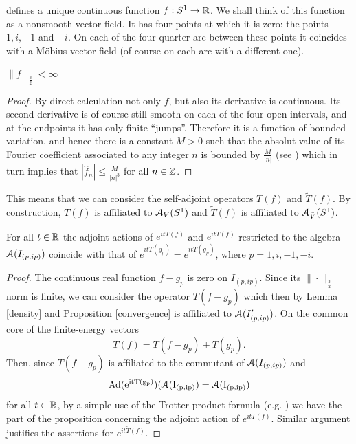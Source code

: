 \documentclass[12pt]{article}
\begin{document}
defines a unique continuous function $f: S^1 \rightarrow {\mathbb R}$.
We shall think of this function as a nonsmooth vector field. 
It has four points at which it is zero: the points $1,i,-1$
and $-i$. On each of the four quarter-arc between these points it 
coincides with a M\"obius vector field (of course on each arc
with a different one). 
\begin{lemma}
$\|f\|_{\frac{3}{2}} < \infty$
\end{lemma}
\begin{proof}
By direct calculation not only $f$, but also its derivative is
continuous. Its second derivative is of course still smooth on
each of the four open intervals, and at the endpoints it has only 
finite ``jumps''. Therefore it is a function of bounded variation, 
and hence there is a constant $M>0$ such that the absolut value of its 
Fourier coefficient associated
to any integer $n$ is bounded by
$\frac{M}{|n|}$ (see \cite[Sect. I.4]{katznelson})
which in turn implies that
$|\hat{f}_n| \leq \frac{M}{|n|^3}$ for all $n \in {\mathbb Z}$. 
\end{proof}
This means that we can consider the self-adjoint operators 
$T(f)$ and $\tilde{T}(f)$. By construction, $T(f)$ is affiliated to 
${\mathcal A}_V(S^1)$ and $\tilde{T}(f)$ is affiliated to ${\mathcal A}_{\tilde{V}}(S^1)$.
\begin{proposition}
For all $t \in {\mathbb R}$ the adjoint actions of $e^{itT(f)}$ and 
$e^{it\tilde{T}(f)}$ restricted to the algebra ${\mathcal A}(I_{(p,ip)})$
coincide with that of $e^{itT(g_p)}=e^{it\tilde{T}(g_p)}$,
where $p=1,i,-1,-i$. 
\end{proposition}
\begin{proof}
The continuous real function $f-g_p$ is zero on $I_{(p,ip)}$.
Since its $\|\cdot\|_{\frac{3}{2}}$ norm is finite, we can consider
the operator $T(f-g_p)$ which then by Lemma \ref{density} and Proposition
\ref{convergence} is affiliated to ${\mathcal A}(I_{(p,ip)}')$. On the common
core of the finite-energy vectors 
\begin{equation}
T(f)=T(f-g_p)+T(g_p).
\end{equation}
Then, since $T(f-g_p)$ is affiliated to the commutant of ${\mathcal A}(I_{(p,ip)})$ 
and
\begin{equation}
\rm{Ad}(e^{itT(g_p)})({\mathcal A}(I_{(p,ip)})={\mathcal A}(I_{(p,ip)})
\end{equation}
for all $t \in {\mathbb R}$, by a simple use of the Trotter product-formula 
(e.g. \cite[Theorem VIII.31]{RSI}) we 
have the part of the proposition concerning the adjoint action of
$e^{itT(f)}$. Similar argument justifies the assertions for
$e^{it\tilde{T}(f)}$. 
\end{proof}
\end{document}
